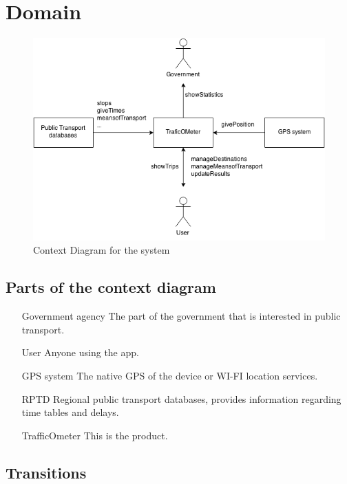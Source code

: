 \documentclass[a4paper]{article}
\begin{document}
	\section{Domain}
		\begin{figure}[h]
				\includegraphics[scale=0.65]{Context-v1.png}
			\caption{Context Diagram for the system}
		\end{figure}
		\subsection{Parts of the context diagram} %
		\label{sub:parts_of_the_context_diagram}
		\begin{itemize}
			\item[Government agency] The part of the government that is interested in public transport. 
			\item[User] Anyone using the app.
			\item[GPS system] The native GPS of the device or WI-FI location services.
			\item[RPTD] Regional public transport databases, provides information regarding time tables and delays.
			\item[TrafficOmeter] This is the product.
		\end{itemize}
		\subsection{Transitions} %
		\label{sub:transitions}
\end{document}
